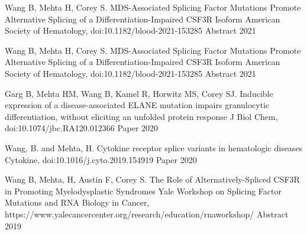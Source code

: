 

\begin{cvhonors}

  \cvhonor
  {Wang B, Mehta H, Corey S. MDS-Associated Splicing Factor Mutations Promote Alternative Splicing of a Differentiation-Impaired CSF3R Isoform} %
  {American Society of Hematology, doi:10.1182/blood-2021-153285} %
  {Abstract} %
  {2021} %

  \cvhonor
  {Wang B, Mehta H, Corey S. MDS-Associated Splicing Factor Mutations Promote Alternative Splicing of a Differentiation-Impaired CSF3R Isoform} %
  {American Society of Hematology, doi:10.1182/blood-2021-153285} %
  {Abstract} %
  {2021} %

    \cvhonor
      {Garg B, Mehta HM, Wang B, Kamel R, Horwitz MS, Corey SJ. Inducible expression of a disease-associated ELANE mutation impairs granulocytic differentiation, without eliciting an unfolded protein response} %
      {J Biol Chem, doi:10.1074/jbc.RA120.012366} %
      {Paper} %
      {2020} %

    \cvhonor
      {Wang, B. and Mehta, H. Cytokine receptor splice variants in hematologic diseases} %
      {Cytokine, doi:10.1016/j.cyto.2019.154919} %
      {Paper} %
      {2020} %
  

  \cvhonor
      {Wang B, Mehta, H, Austin F, Corey S. The Role of Alternatively-Spliced CSF3R in Promoting Myelodysplastic Syndromes} %
      {Yale Workshop on Splicing Factor Mutations and RNA Biology in Cancer, https://www.yalecancercenter.org/research/education/rnaworkshop/} %
      {Abstract} %
      {2019} %
  
  
  \end{cvhonors}
